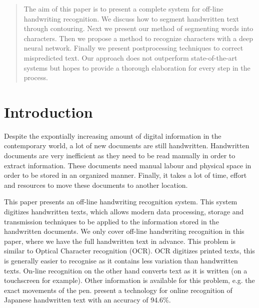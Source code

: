 \documentclass{article}
\begin{document}
\begin{abstract}
The aim of this paper is to present a complete system for off-line handwriting recognition.
We discuss how to segment handwritten text through contouring. Next we present our method of segmenting words into characters.
Then we propose a method to recognize characters with a deep neural network.
Finally we present postprocessing techniques to correct mispredicted text.
Our approach does not outperform state-of-the-art systems but hopes to provide a thorough elaboration for every step in the process.
\end{abstract}

\section{Introduction}
Despite the expontially increasing amount of digital information in the contemporary world, a lot of new documents are still handwritten.
Handwritten documents are very inefficient as they need to be read manually in order to extract information.
These documents need manual labour and physical space in order to be stored in an organized manner.
Finally, it takes a lot of time, effort and resources to move these documents to another location.

This paper presents an off-line handwriting recognition system. This system digitizes handwritten texts, which allows modern data processing, storage and transmission techniques to be applied to the information stored in the handwritten documents.
We only cover off-line handwriting recognition in this paper, where we have the full handwritten text in advance. This problem is similar to Optical Character recognition (OCR). OCR digitizes printed texts, this is generally easier to recognise as it contains less variation than handwritten texts.
On-line recognition on the other hand converts text as it is written (on a touchscreen for example). Other information is available for this problem, e.g. the exact movements of the pen. \cite{olcr} present a technology for online recognition of Japanese handwritten text with an accuracy of 94.6\%.
\end{document}
